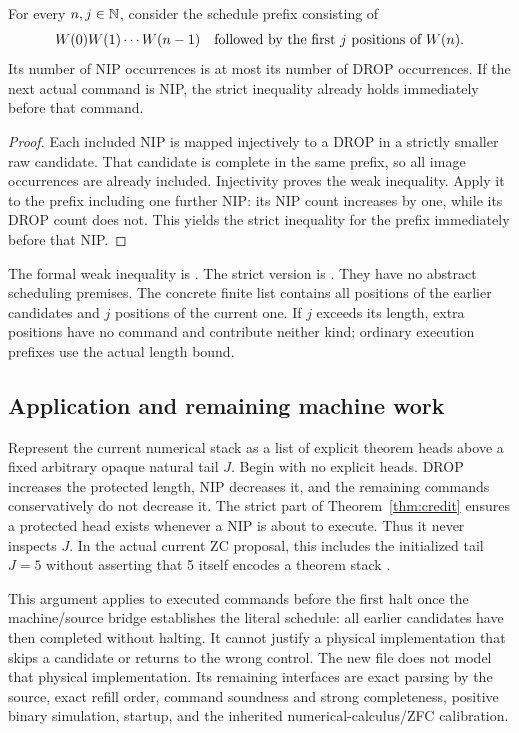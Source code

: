 \begin{theorem}\label{thm:credit}
For every $n,j\in\mathbb{N}$, consider the schedule prefix consisting of
\[
 W(0)W(1)\cdots W(n-1)
 \quad\hbox{followed by the first $j$ positions of }W(n).
\]
Its number of NIP occurrences is at most its number of DROP occurrences.
If the next actual command is NIP, the strict inequality already holds
immediately before that command.
\end{theorem}
\begin{proof}
Each included NIP is mapped injectively to a DROP in a strictly smaller raw
candidate. That candidate is complete in the same prefix, so all image
occurrences are already included. Injectivity proves the weak inequality.
Apply it to the prefix including one further NIP: its NIP count increases
by one, while its DROP count does not. This yields the strict inequality
for the prefix immediately before that NIP.
\end{proof}

The formal weak inequality is .
The strict version is .
They have no abstract scheduling premises.
The concrete finite list  contains all
positions of the earlier candidates and $j$ positions of the current one.
If $j$ exceeds its length, extra positions have no command and contribute
neither kind; ordinary execution prefixes use the actual length bound.

\subsection{Application and remaining machine work}

Represent the current numerical stack as a list of explicit theorem heads
above a fixed arbitrary opaque natural tail $J$. Begin with no explicit
heads. DROP increases the protected length, NIP decreases it, and the
remaining commands conservatively do not decrease it. The strict part of
Theorem~\ref{thm:credit} ensures a protected head exists whenever a NIP is
about to execute. Thus it never inspects $J$. In the actual current ZC
proposal, this includes the initialized tail $J=5$ without asserting that
5 itself encodes a theorem stack \cite{zerocredit}.

This argument applies to executed commands before the first halt once the
machine/source bridge establishes the literal schedule: all earlier
candidates have then completed without halting. It cannot justify a physical
implementation that skips a candidate or returns to the wrong control.
The new file does not model that physical implementation. Its remaining
interfaces are exact parsing by the source, exact refill order, command
soundness and strong completeness, positive binary simulation, startup,
and the inherited numerical-calculus/ZFC calibration.

